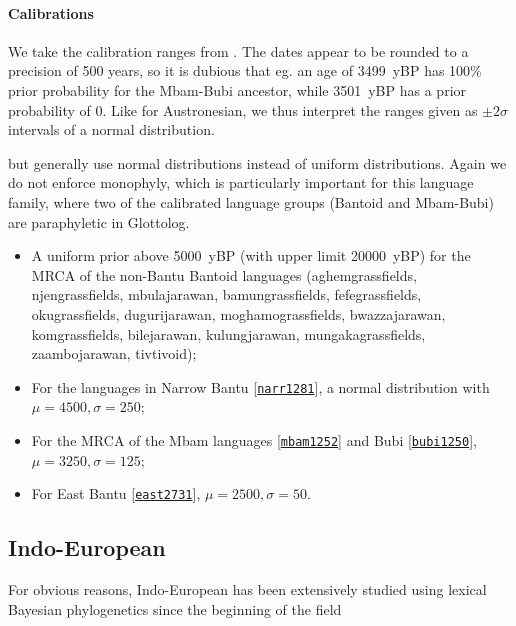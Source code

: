 \documentclass[]{rsos}%
\newcommand{\glot}[2]{#1 {\scriptsize{[\texttt{\href{https://glottolog.org/resource/languoid/id/#2}{#2}}]}}}
\begin{document}
\paragraph{Calibrations}
We take the calibration ranges from \textcite{grollemund2015bantu}.
The dates appear to be rounded to a precision of 500 years, so it is dubious that eg. an age of 3499~yBP has 100\% prior probability for the Mbam-Bubi ancestor, while 3501~yBP has a prior probability of 0.
Like for Austronesian, we thus interpret the ranges given as $\pm 2\sigma$ intervals of a normal distribution.

but generally use normal distributions instead of uniform distributions. Again we do not enforce monophyly, which is particularly important for this language family, where two of the calibrated language groups (Bantoid and Mbam-Bubi) are paraphyletic in Glottolog.
\begin{itemize}
\item A uniform prior above 5000~yBP (with upper limit 20000~yBP) for the MRCA of the non-Bantu Bantoid languages (aghemgrassfields, njengrassfields, mbulajarawan, bamungrassfields, fefegrassfields, okugrassfields, dugurijarawan, moghamograssfields, bwazzajarawan, komgrassfields, bilejarawan, kulungjarawan, mungakagrassfields, zaambojarawan, tivtivoid);
\item For the languages in \glot{Narrow Bantu}{narr1281}, a normal distribution with $\mu=4500, \sigma=250$;
\item For the MRCA of the \glot{Mbam languages}{mbam1252} and \glot{Bubi}{bubi1250}, $\mu=3250, \sigma=125$;
\item For \glot{East Bantu}{east2731}, $\mu=2500, \sigma=50$.
\end{itemize}

\subsection{Indo-European}\label{s:indoeuropean}
For obvious reasons, Indo-European has been extensively studied using lexical Bayesian phylogenetics since the beginning
of the field
\parencite{bouckaert2012mapping,chang2015ancestryconstrained,gray2003language,holm2017steppe,rama2018three,willems2016using}
\end{document}
